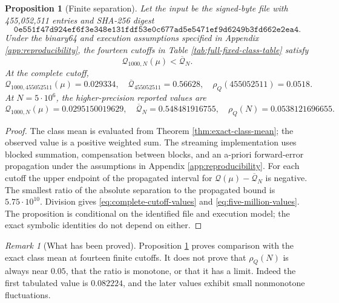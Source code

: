 \documentclass[11pt,reqno]{amsart}
\numberwithin{equation}{section}
\theoremstyle{plain}
\newtheorem{proposition}[theorem]{Proposition}
\theoremstyle{definition}
\theoremstyle{remark}
\newtheorem{remark}[theorem]{Remark}
\newcommand{\QF}{\mathcal Q}
\begin{document}
\begin{proposition}[Finite separation]
\label{prop:finite-separation}
Let the input be the signed-byte file with 455,052,511 entries and SHA-256
digest
\begin{equation}
\texttt{0e551f47d924ef6f3e348e131fdf53e0c677ad5e5471ef9d6249b3fd662e2ea4}.
\label{eq:data-sha256}
\end{equation}
Under the binary64 and execution assumptions specified in Appendix
\ref{app:reproducibility}, the fourteen cutoffs in Table
\ref{tab:full-fixed-class-table} satisfy
\begin{equation}
\QF_{1000,N}(\mu)<\overline{\QF}_N.
\label{eq:finite-separation-inequality}
\end{equation}
At the complete cutoff,
\begin{equation}
\QF_{1000,455052511}(\mu)=0.029334,\quad
\overline{\QF}_{455052511}=0.56628,\quad
\rho_Q(455052511)=0.0518.
\label{eq:complete-cutoff-values}
\end{equation}
At \(N=5\cdot10^6\), the higher-precision reported values are
\begin{equation}
\QF_{1000,N}(\mu)=0.0295150019629,\quad
\overline{\QF}_N=0.548481916755,\quad
\rho_Q(N)=0.0538121696655.
\label{eq:five-million-values}
\end{equation}
\end{proposition}

\begin{proof}
The class mean is evaluated from Theorem \ref{thm:exact-class-mean}; the
observed value is a positive weighted sum.  The streaming implementation uses
blocked summation, compensation between blocks, and an a-priori forward-error
propagation under the assumptions in Appendix \ref{app:reproducibility}.
For each cutoff the upper endpoint of the propagated interval for
\(\QF(\mu)-\overline{\QF}_N\) is negative.  The smallest ratio of the
absolute separation to the propagated bound is \(5.75\cdot10^{10}\).
Division gives \eqref{eq:complete-cutoff-values} and
\eqref{eq:five-million-values}.  The proposition is conditional on the
identified file and execution model; the exact symbolic identities do not
depend on either.
\end{proof}

\begin{remark}[What has been proved]
\label{rem:finite-not-asymptotic}
Proposition \ref{prop:finite-separation} proves comparison with the exact
class mean at fourteen finite cutoffs.  It does not prove that
\(\rho_Q(N)\) is always near \(0.05\), that the ratio is monotone, or that it
has a limit.  Indeed the first tabulated value is \(0.082224\), and the later
values exhibit small nonmonotone fluctuations.
\end{remark}
\end{document}
